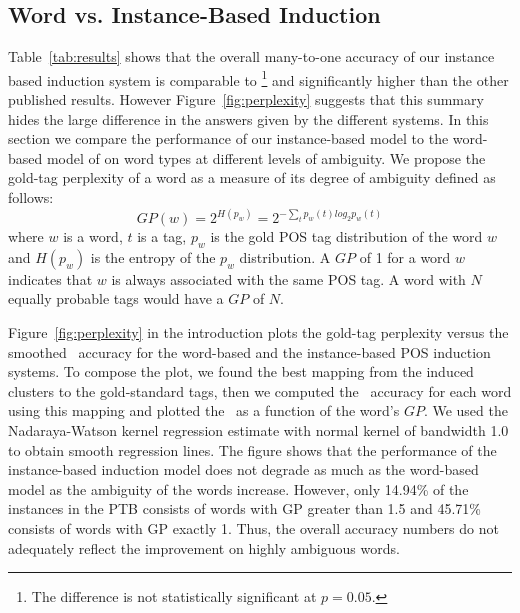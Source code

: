 \subsection{Word vs. Instance-Based Induction}
\label{sec:typevsinstance}

Table~\ref{tab:results} shows that the overall many-to-one accuracy of
our instance based induction system is comparable to
\cite{yatbaz-sert-yuret:2012:EMNLP-CoNLL}\footnote{The difference is
  not statistically significant at $p=0.05$.} and significantly higher
than the other published results.  However Figure~\ref{fig:perplexity}
suggests that this summary hides the large difference in the answers
given by the different systems.  In this section we compare the
performance of our instance-based model to the word-based model of
\cite{yatbaz-sert-yuret:2012:EMNLP-CoNLL} on word types at different
levels of ambiguity.  We propose the gold-tag perplexity of a word as
a measure of its degree of ambiguity defined as follows:
\begin{equation*} \label{eq:tag-perp}
GP(w) = 2^{H(p_w)} = 2^{-\sum_{t} p_w(t)log_2 p_w(t)}
\end{equation*}
\noindent where $w$ is a word, $t$ is a tag, $p_w$ is the gold POS tag
distribution of the word $w$ and $H(p_w)$ is the entropy of the $p_w$
distribution.  A $GP$ of 1 for a word $w$ indicates that $w$ is always
associated with the same POS tag.  A word with $N$ equally probable
tags would have a $GP$ of $N$.

Figure~\ref{fig:perplexity} in the introduction plots the gold-tag
perplexity versus the smoothed \mto\ accuracy for the word-based and
the instance-based POS induction systems.  To compose the plot, we
found the best mapping from the induced clusters to the gold-standard
tags, then we computed the \mto\ accuracy for each word using this
mapping and plotted the \mto\ as a function of the word's $GP$.  We
used the Nadaraya-Watson kernel regression estimate
\cite{nadaraya1964estimating,watson1964smooth} with normal kernel of
bandwidth 1.0 to obtain smooth regression lines.  The figure shows
that the performance of the instance-based induction model does not
degrade as much as the word-based model as the ambiguity of the words
increase.  However, only 14.94\% of the instances in the PTB consists
of words with GP greater than 1.5 and 45.71\% consists of words with
GP exactly 1.  Thus, the overall accuracy numbers do not adequately
reflect the improvement on highly ambiguous words.


